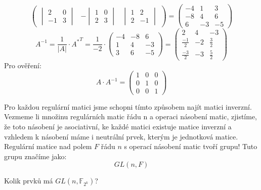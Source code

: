 \begin{example}
\[\begin{pmatrix}
            \begin{vmatrix}
                2 & 0 \\
                -1 & 3
            \end{vmatrix} &
            - \begin{vmatrix}
                1 & 0 \\
                2 & 3
            \end{vmatrix} &
            \begin{vmatrix}
                1 & 2 \\
                2 & -1
            \end{vmatrix}
        \end{pmatrix}
        = \begin{pmatrix}
            -4 & 1 & 3 \\
            -8 & 4 & 6 \\
            6 & -3 & -5
        \end{pmatrix}
    \]
    \[
    A^{-1} = \frac{1}{|A|} \cdot {A^*}^T = \frac{1}{-2} \cdot
        \begin{pmatrix}
            -4 & -8 & 6\\
            1 & 4 & -3 \\
            3 & 6 & -5
        \end{pmatrix}
        = \begin{pmatrix}
            2  & 4 & -3 \\
            \frac{-1}{2}  & -2 & \frac{3}{2} \\
            \frac{-3}{2} & -3 & \frac{5}{2}
        \end{pmatrix}
    \]
    Pro ověření:
    \[
      A \cdot A^{-1} =
      \begin{pmatrix}
          1 & 0 & 0\\
          0 & 1 & 0\\
          0 & 0 & 1
      \end{pmatrix}
    \]
 \end{example}

 Pro každou regulární matici jsme schopni tímto způsobem najít matici inverzní.
 Vezmeme li množinu regulárních matic řádu n a operaci násobení matic, zjistíme,
 že toto násobení je asociativní, ke každé matici existuje matice inverzní a vzhledem
 k násobení máme i neutrální prvek, kterým je jednotková matice. Regulární matice nad
 polem $F$ řádu $n$ s operací násobení matic tvoří grupu! Tuto grupu značíme jako:
 $$GL(n, F)$$

\begin{example}
    Kolik prvků má $GL(n, \mathbb{F}_{2^k})$?
\end{example}

